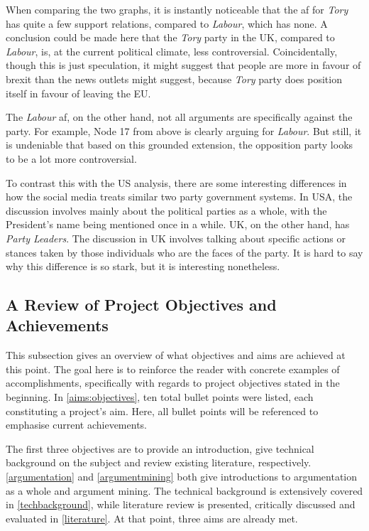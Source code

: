            When comparing the two graphs, it is instantly noticeable that the \gls{af} for \textit{Tory} has quite a few support relations, compared to \textit{Labour}, which has none. A conclusion could be made here that the \textit{Tory} party in the UK, compared to \textit{Labour}, is, at the current political climate, less controversial. Coincidentally, though this is just speculation, it might suggest that people are more in favour of brexit than the news outlets might suggest, because \textit{Tory} party does position itself in favour of leaving the EU.
            
            The \textit{Labour} \gls{af}, on the other hand, not all arguments are specifically against the party. For example, Node 17 from above is clearly arguing for \textit{Labour}. But still, it is undeniable that based on this grounded extension, the opposition party looks to be a lot more controversial.
            
            To contrast this with the US analysis, there are some interesting differences in how the social media treats similar two party government systems. In USA, the discussion involves mainly about the political parties as a whole, with the President's name being mentioned once in a while. UK, on the other hand, has \textit{Party Leaders}. The discussion in UK involves talking about specific actions or stances taken by those individuals who are the faces of the party. It is hard to say why this difference is so stark, but it is interesting nonetheless.

    \subsection{A Review of Project Objectives and Achievements} \label{softachieve}
        This subsection gives an overview of what objectives and aims are achieved at this point. The goal here is to reinforce the reader with concrete examples of accomplishments, specifically with regards to project objectives stated in the beginning. In \cref{aims:objectives}, ten total bullet points were listed, each constituting a project's aim. Here, all bullet points will be referenced to emphasise current achievements.
        
        The first three objectives are to provide an introduction, give technical background on the subject and review existing literature, respectively. \cref{argumentation} and \cref{argumentmining} both give introductions to argumentation as a whole and argument mining. The technical background is extensively covered in \cref{techbackground}, while literature review is presented, critically discussed and evaluated in \cref{literature}. At that point, three aims are already met.
        
